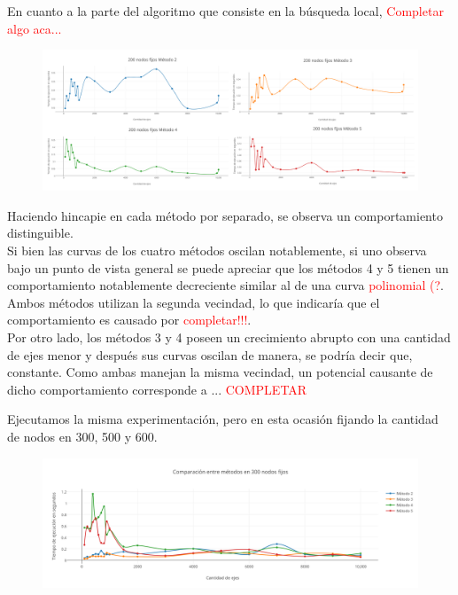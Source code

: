 En cuanto a la parte del algoritmo que consiste en la b\'usqueda local, \textcolor{red}{Completar algo aca...}

   \begin{figure}[h!]
   \begin{center}
 	\includegraphics[scale=0.08]{imagenes/local/tiempos/200nodos2.png}
   \end{center}
 \end{figure}
 
 Haciendo hincapie en cada m\'etodo por separado, se observa un comportamiento distinguible.\\
 
 Si bien las curvas de los cuatro m\'etodos oscilan notablemente, si uno observa bajo un punto de vista general se puede apreciar que los m\'etodos 4 y 5 tienen un comportamiento notablemente decreciente similar al de una curva \textcolor{red}{polinomial (?}. Ambos m\'etodos utilizan la segunda vecindad, lo que indicar\'ia que el comportamiento es causado por \textcolor{red}{completar!!!}.\\
 
 Por otro lado, los m\'etodos 3 y 4 poseen un crecimiento abrupto con una cantidad de ejes menor y despu\'es sus curvas oscilan de manera, se podr\'ia decir que, constante. Como ambas manejan la misma vecindad, un potencial causante de dicho comportamiento corresponde a ... \textcolor{red}{COMPLETAR}\\

\bigskip

Ejecutamos la misma experimentaci\'on, pero en esta ocasi\'on fijando la cantidad de nodos en 300, 500 y 600. 
 
  \begin{figure}[h!]
   \begin{center}
 	\includegraphics[scale=0.55]{imagenes/local/tiempos/300nodos.png}
   \end{center}
 \end{figure}
 

